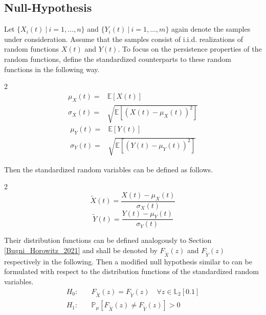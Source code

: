 \documentclass[12pt, a4paper]{article}
\theoremstyle{MAstyle} \newtheorem{assumption}{Assumption}[section]
\theoremstyle{MAstyle} \newtheorem{definition}{Definition}[section]
\theoremstyle{MAstyle} \newtheorem{theorem}{Theorem}[section]
\begin{document}
		\subsection{Null-Hypothesis}
		Let $\{X_i(t) \ | \  i = 1, \dots, n\}$ and $\{Y_i(t) \ | \  i = 1, \dots, m\}$ again denote the samples under consideration. Assume that the samples consist of i.i.d. realizations of random functions $X(t)$ and $Y(t)$.
		To focus on the persistence properties of the random functions, define the standardized counterparts to these random functions in the following way.
		\begin{multicols}{2}
			\noindent
			\begin{equation*}
				\begin{split}
					\mu_{X}(t) = &\mathbb{E}\left[X(t)\right] \\
					\sigma_{X}(t) = &\sqrt{\mathbb{E}\left[\left(X(t) - \mu_{X}(t)\right)^2\right]}
				\end{split}
			\end{equation*}
			\begin{equation}
				\begin{split}
					\mu_{Y}(t) = &\mathbb{E}\left[Y(t)\right] \\
					\sigma_{Y}(t) = &\sqrt{\mathbb{E}\left[\left(Y(t) - \mu_{Y}(t)\right)^2\right]}
				\end{split}
			\end{equation}
		\end{multicols}
		Then the standardized random variables can be defined as follows.
		\begin{multicols}{2}
			\noindent
			\begin{equation*}
				\tilde{X}(t) = \frac{X(t) - \mu_{X}(t)}{\sigma_{X}(t)}
			\end{equation*}
			\begin{equation}
				\tilde{Y}(t) = \frac{Y(t) - \mu_{Y}(t)}{\sigma_{Y}(t)}
			\end{equation}
		\end{multicols}
		Their distribution functions can be defined analogously to Section \ref{Bugni_Horowitz_2021} and shall be denoted by $F_{\tilde{X}}(z)$ and $F_{\tilde{Y}}(z)$ respectively in the following. Then a modified null hypothesis similar to \cite{bugni_permutation_2021} can be formulated with respect to the distribution functions of the standardized random variables.
		\begin{equation}
			\begin{split}
				H_0: \quad &F_{\tilde{X}}(z) = F_{\tilde{Y}}(z) \quad \forall z \in \mathbb{L}_2[0.1] \\
				H_1: \quad &\mathbb{P}_{\mu}\left[F_{\tilde{X}}(z) \neq F_{\tilde{Y}}(z)\right] > 0
			\end{split}
		\end{equation}
\end{document}
